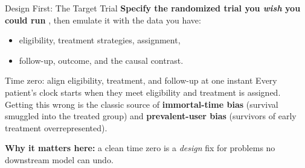 \documentclass[aspectratio=169]{beamer}
\begin{document}
\begin{frame}{Design First: The Target Trial}
  \small
  \textbf{Specify the randomized trial you \emph{wish} you could run} \cite{hernan2016target}, then emulate it with the data you have:
  \begin{itemize}
    \item eligibility, treatment strategies, assignment,
    \item follow-up, outcome, and the causal contrast.
  \end{itemize}
  \vspace{0.6em}

  \begin{block}{Time zero: align eligibility, treatment, and follow-up at one instant}
    Every patient's clock starts when they meet eligibility and treatment is
    assigned. Getting this wrong is the classic source of
    \textbf{immortal-time bias} (survival smuggled into the treated group)
    and \textbf{prevalent-user bias} (survivors of early treatment
    overrepresented).
  \end{block}
  \vspace{0.4em}

  \textcolor{accent}{\textbf{Why it matters here:}} a clean time zero is a \emph{design} fix for problems no downstream model can undo.
\end{frame}
\end{document}
